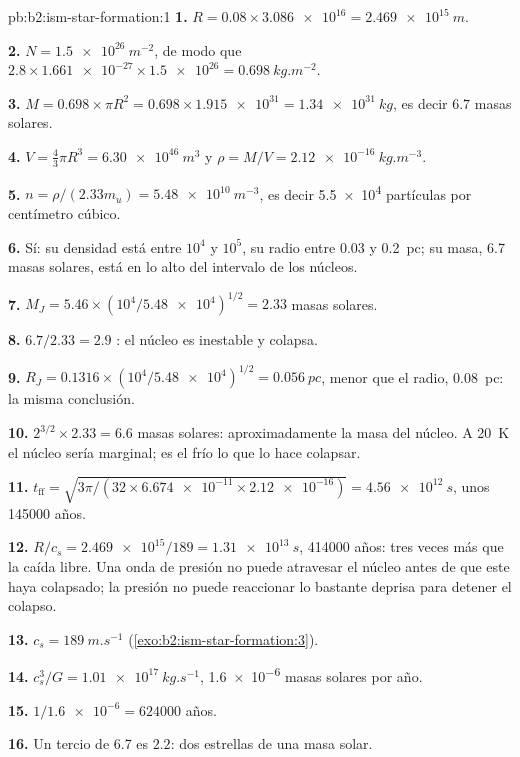 \begin{solution}{pb:b2:ism-star-formation:1}
\textbf{1.} $R = 0.08\times\num{3.086e16} = \qty{2.469e15}{m}$.

\textbf{2.} $N = \qty{1.5e26}{m^{-2}}$, de modo que $2.8\times\num{1.661e-27}\times\num{1.5e26} =
\qty{0.698}{kg.m^{-2}}$.

\textbf{3.} $M = 0.698\times\pi R^2 = 0.698\times\num{1.915e31} = \qty{1.34e31}{kg}$,
es decir $6.7$ masas solares.

\textbf{4.} $V = \tfrac43\pi R^3 = \qty{6.30e46}{m^3}$ y
$\rho = M/V = \qty{2.12e-16}{kg.m^{-3}}$.

\textbf{5.} $n = \rho/(2.33m_u) = \qty{5.48e10}{m^{-3}}$, es decir \num{5.5e4} partículas
por centímetro cúbico.

\textbf{6.} Sí: su densidad está entre $10^4$ y $10^5$, su radio entre 0.03 y
\qty{0.2}{pc}; su masa, 6.7 masas solares, está en lo alto del intervalo de los núcleos.

\textbf{7.} $M_J = 5.46\times(10^4/\num{5.48e4})^{1/2} = 2.33$ masas solares.

\textbf{8.} $6.7/2.33 = 2.9$ : el núcleo es inestable y colapsa.

\textbf{9.} $R_J = 0.1316\times(10^4/\num{5.48e4})^{1/2} = \qty{0.056}{pc}$, menor que
el radio, \qty{0.08}{pc}: la misma conclusión.

\textbf{10.} $2^{3/2}\times2.33 = 6.6$ masas solares: aproximadamente la masa del núcleo. A
\qty{20}{K} el núcleo sería marginal; es el frío lo que lo hace colapsar.

\textbf{11.} $t_{\mathrm{ff}} = \sqrt{3\pi/(32\times\num{6.674e-11}\times\num{2.12e-16})}
= \qty{4.56e12}{s}$, unos \num{145000} años.

\textbf{12.} $R/c_s = \num{2.469e15}/189 = \qty{1.31e13}{s}$, \num{414000} años: tres
veces más que la caída libre. Una onda de presión no puede atravesar el núcleo antes de que este haya
colapsado; la presión no puede reaccionar lo bastante deprisa para detener el colapso.

\textbf{13.} $c_s = \qty{189}{m.s^{-1}}$ (\cref{exo:b2:ism-star-formation:3}).

\textbf{14.} $c_s^3/G = \qty{1.01e17}{kg.s^{-1}}$, \num{1.6e-6} masas solares por año.

\textbf{15.} $1/\num{1.6e-6} = \num{624000}$ años.

\textbf{16.} Un tercio de 6.7 es $2.2$: dos estrellas de una masa solar.


\end{solution}
